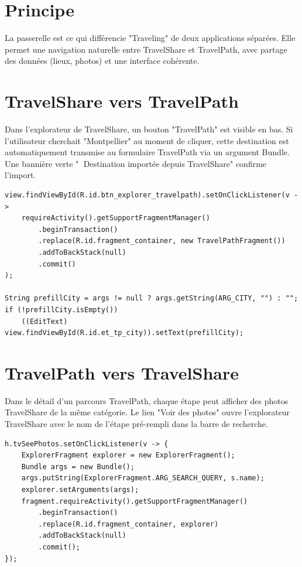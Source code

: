 \documentclass[a4paper,12pt,openany]{report}
\begin{document}
\section{Principe}

La passerelle est ce qui différencie "Traveling" de deux applications séparées.
Elle permet une navigation naturelle entre TravelShare et TravelPath, avec partage
des données (lieux, photos) et une interface cohérente.

\section{TravelShare vers TravelPath}

Dans l'explorateur de TravelShare, un bouton "TravelPath" est visible en bas.
Si l'utilisateur cherchait "Montpellier" au moment de cliquer, cette destination
est automatiquement transmise au formulaire TravelPath via un argument Bundle.
Une bannière verte "📍 Destination importée depuis TravelShare" confirme l'import.

\begin{lstlisting}
view.findViewById(R.id.btn_explorer_travelpath).setOnClickListener(v ->
    requireActivity().getSupportFragmentManager()
        .beginTransaction()
        .replace(R.id.fragment_container, new TravelPathFragment())
        .addToBackStack(null)
        .commit()
);

String prefillCity = args != null ? args.getString(ARG_CITY, "") : "";
if (!prefillCity.isEmpty())
    ((EditText) view.findViewById(R.id.et_tp_city)).setText(prefillCity);
\end{lstlisting}

\section{TravelPath vers TravelShare}

Dans le détail d'un parcours TravelPath, chaque étape peut afficher des photos
TravelShare de la même catégorie. Le lien "Voir des photos" ouvre l'explorateur
TravelShare avec le nom de l'étape pré-rempli dans la barre de recherche.

\begin{lstlisting}
h.tvSeePhotos.setOnClickListener(v -> {
    ExplorerFragment explorer = new ExplorerFragment();
    Bundle args = new Bundle();
    args.putString(ExplorerFragment.ARG_SEARCH_QUERY, s.name);
    explorer.setArguments(args);
    fragment.requireActivity().getSupportFragmentManager()
        .beginTransaction()
        .replace(R.id.fragment_container, explorer)
        .addToBackStack(null)
        .commit();
});
\end{lstlisting}
\end{document}
